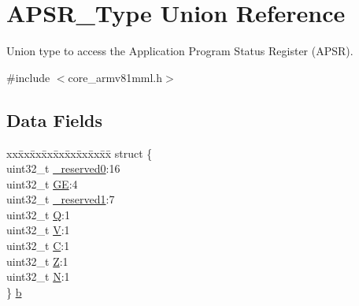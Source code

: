 \hypertarget{union_a_p_s_r___type}{}\section{A\+P\+S\+R\+\_\+\+Type Union Reference}
\label{union_a_p_s_r___type}


Union type to access the Application Program Status Register (A\+P\+SR).  




{\ttfamily \#include $<$core\+\_\+armv81mml.\+h$>$}

\subsection*{Data Fields}
\begin{DoxyCompactItemize}
\item 
\begin{tabbing}
xx\=xx\=xx\=xx\=xx\=xx\=xx\=xx\=xx\=\kill
struct \{\\
\>uint32\_t \mbox{\hyperlink{union_a_p_s_r___type_ac8a6a13838a897c8d0b8bc991bbaf7c1}{\_reserved0}}:16\\
\>uint32\_t \mbox{\hyperlink{union_a_p_s_r___type_aa91800ec6e90e457c7a1acd1f2e17099}{GE}}:4\\
\>uint32\_t \mbox{\hyperlink{union_a_p_s_r___type_a959a73d8faee56599b7e792a7c5a2d16}{\_reserved1}}:7\\
\>uint32\_t \mbox{\hyperlink{union_a_p_s_r___type_a65f27ddc4f7e09c14ce7c5211b2e000a}{Q}}:1\\
\>uint32\_t \mbox{\hyperlink{union_a_p_s_r___type_acd4a2b64faee91e4a9eef300667fa222}{V}}:1\\
\>uint32\_t \mbox{\hyperlink{union_a_p_s_r___type_a7a1caf92f32fe9ebd8d1fe89b06c7776}{C}}:1\\
\>uint32\_t \mbox{\hyperlink{union_a_p_s_r___type_a5ae954cbd9986cd64625d7fa00943c8e}{Z}}:1\\
\>uint32\_t \mbox{\hyperlink{union_a_p_s_r___type_abae0610bc2a97bbf7f689e953e0b451f}{N}}:1\\
\} \mbox{\hyperlink{union_a_p_s_r___type_a2e5b85cff450c7f92c7388dd09f10065}{b}}\\


\end{tabbing}
\end{DoxyCompactItemize}
